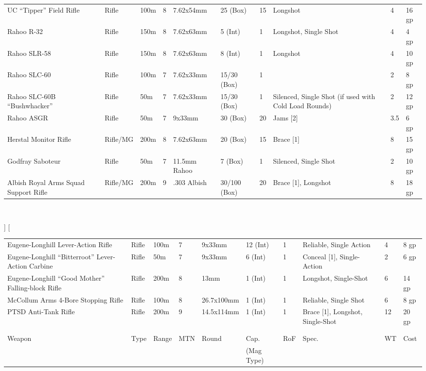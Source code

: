 \documentclass[a4paper, twocolumn, openany]{book}
\begin{document}
{{{\begin{tabular}{p{2.6cm}lllp{2cm}llp{2cm}ll}
	UC “Tipper” Field Rifle 								& Rifle 	& 100m 	& 8 & 7.62x54mm 	& 25 (Box) 		& 15 	& Longshot 												& 4 	& 16 gp \\
	Rahoo R-32 												& Rifle 	& 150m 	& 8 & 7.62x63mm 	& 5 (Int) 		& 1 	& Longshot, Single Shot 								& 4 	& 4 gp 	\\
	Rahoo SLR-58 											& Rifle 	& 150m 	& 8 & 7.62x63mm 	& 8 (Int) 		& 1 	& Longshot												& 4 	& 10 gp \\
	Rahoo SLC-60 											& Rifle 	& 100m 	& 7 & 7.62x33mm 	& 15/30 (Box) 	& 1 	& 														& 2 	& 8 gp 	\\
	Rahoo SLC-60B “Bushwhacker” 							& Rifle 	& 50m 	& 7 & 7.62x33mm 	& 15/30 (Box) 	& 1 	& Silenced, Single Shot (if used with Cold Load Rounds)	& 2 	& 12 gp \\
	Rahoo ASGR 												& Rifle 	& 50m 	& 7 & 9x33mm 		& 30 (Box) 		& 20 	& Jams [2]												& 3.5 	& 6 gp 	\\
	Herstal Monitor Rifle 									& Rifle/MG 	& 200m 	& 8 & 7.62x63mm 	& 20 (Box) 		& 15 	& Brace [1]												& 8 	& 15 gp \\
	Godfray Saboteur 										& Rifle 	& 50m 	& 7 & 11.5mm Rahoo 	& 7 (Box) 		& 1 	& Silenced, Single Shot									& 2 	& 10 gp \\
	Albish Royal Arms Squad Support Rifle 					& Rifle/MG 	& 200m 	& 9 & .303 Albish 	& 30/100 (Box) 	& 20 	& Brace [1], Longshot									& 8 	& 18 gp \\
	\end{tabular}\\ }
}]
\twocolumn[{

	{\centering
	\begin{tabular}{p{2.5cm}lllp{2cm}llp{2cm}ll}
	Eugene-Longhill Lever-Action Rifle 						& Rifle 	& 100m 	& 7 & 9x33mm 		& 12 (Int) 		& 1 	& Reliable, Single Action								& 4 	& 8 gp 	\\
	Eugene-Longhill “Bitterroot” Lever-Action Carbine 		& Rifle 	& 50m 	& 7 & 9x33mm 		& 6 (Int) 		& 1 	& Conceal [1], \newline Single-Action							& 2 	& 6 gp 	\\
	Eugene-Longhill “Good Mother” Falling-block Rifle 		& Rifle 	& 200m 	& 8 & 13mm 			& 1 (Int) 		& 1 	& Longshot, Single-Shot									& 6 	& 14 gp \\
	McCollum Arms 4-Bore Stopping Rifle 					& Rifle 	& 100m 	& 8 & 26.7x100mm 	& 1 (Int) 		& 1 	& Reliable, Single Shot									& 6 	& 8 gp 	\\
	PTSD Anti-Tank Rifle 									& Rifle 	& 200m 	& 9 & 14.5x114mm 	& 1 (Int) 		& 1 	& Brace [1], Longshot, Single-Shot						& 12 	& 20 gp \\
	\\ \hline \\
	Weapon & Type & Range & MTN & Round & Cap. & RoF & Spec. & WT & Cost\\ 
	&&&&& (Mag Type) \\
	\end{tabular}\\[2\baselineskip] }

}}
\end{document}
